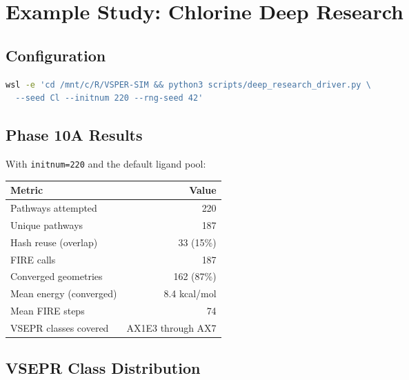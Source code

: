 \documentclass[11pt,a4paper]{article}
\begin{document}
\section{Example Study: Chlorine Deep Research}
\label{sec:example}

\subsection{Configuration}

\begin{lstlisting}[language=bash,title={\textbf{Example invocation}}]
wsl -e 'cd /mnt/c/R/VSPER-SIM && python3 scripts/deep_research_driver.py \
  --seed Cl --initnum 220 --rng-seed 42'
\end{lstlisting}

\subsection{Phase 10A Results}

With \texttt{initnum=220} and the default ligand pool:

\begin{center}
\begin{tabular}{lr}
\toprule
\textbf{Metric} & \textbf{Value} \\
\midrule
Pathways attempted      & 220 \\
Unique pathways         & 187 \\
Hash reuse (overlap)    & 33 (15\%) \\
FIRE calls              & 187 \\
Converged geometries    & 162 (87\%) \\
Mean energy (converged) & 8.4 kcal/mol \\
Mean FIRE steps         & 74 \\
VSEPR classes covered   & AX1E3 through AX7 \\
\bottomrule
\end{tabular}
\end{center}

\subsection{VSEPR Class Distribution}
\end{document}
